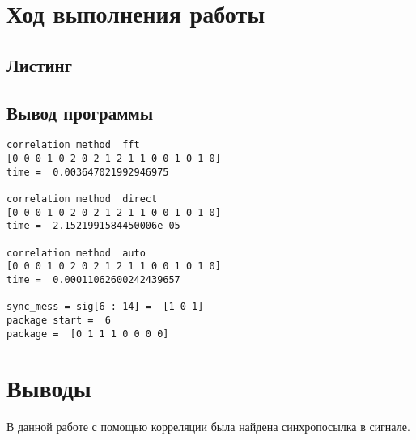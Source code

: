 \section{Ход выполнения работы}

\subsection{Листинг}


\parindent=1cm %

\subsection{Вывод программы}

\begin{lstlisting}
correlation method  fft
[0 0 0 1 0 2 0 2 1 2 1 1 0 0 1 0 1 0]
time =  0.003647021992946975

correlation method  direct
[0 0 0 1 0 2 0 2 1 2 1 1 0 0 1 0 1 0]
time =  2.1521991584450006e-05

correlation method  auto
[0 0 0 1 0 2 0 2 1 2 1 1 0 0 1 0 1 0]
time =  0.00011062600242439657

sync_mess = sig[6 : 14] =  [1 0 1]
package start =  6
package =  [0 1 1 1 0 0 0 0]
\end{lstlisting}

\section{Выводы}
В данной работе с помощью корреляции была найдена синхропосылка в сигнале. 

